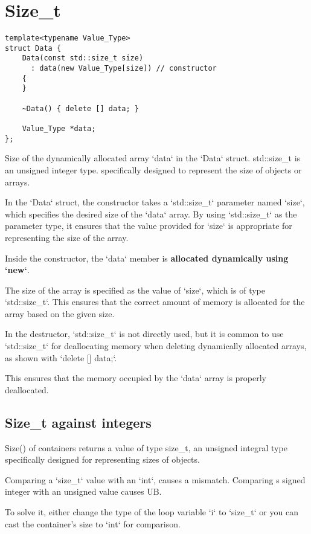 \section{Size\_t}

\begin{verbatim}
template<typename Value_Type>
struct Data {
    Data(const std::size_t size)
      : data(new Value_Type[size]) // constructor
    {
    }

    ~Data() { delete [] data; }

    Value_Type *data;
};
\end{verbatim}

Size of the dynamically allocated array `data` in the `Data` struct. 
std::size\_t is an unsigned integer type.
specifically designed to represent the size of objects or arrays. 

In the `Data` struct, the constructor takes a `std::size\_t` parameter named `size`,
which specifies the desired size of the `data` array. 
By using `std::size\_t` as the parameter type, 
it ensures that the value provided for `size` is appropriate for representing the size of the array.

Inside the constructor, the `data` member is \textbf{allocated dynamically using `new`}.

The size of the array is specified as the value of `size`, which is of type `std::size\_t`. 
This ensures that the correct amount of memory is allocated for the array based on the given size.

In the destructor, `std::size\_t` is not directly used, but it is common to use `std::size\_t`
for deallocating memory when deleting dynamically allocated arrays, as shown with `delete [] data;`.

This ensures that the memory occupied by the `data` array is properly deallocated.

\subsection{Size\_t against integers}

Size() of containers returns a value of type size\_t, 
an unsigned integral type specifically designed for representing sizes of objects.

Comparing a `size\_t` value with an `int`, causes a mismatch.
Comparing s signed integer with an unsigned value causes UB.

To solve it, either change the type of the loop variable `i` to `size\_t`
or you can cast the container's size to `int` for comparison.

